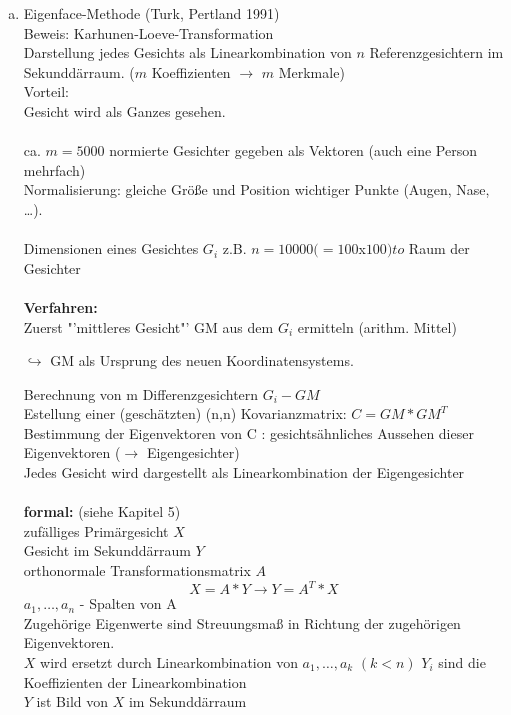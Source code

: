 \documentclass[a4paper,12pt]{scrreprt}
\newcommand{\Nb}[1]{\textbf{#1}}
\begin{document}
\begin{enumerate}[a)]
 \item Eigenface-Methode (Turk, Pertland 1991)\\
  Beweis: Karhunen-Loeve-Transformation\\
  Darstellung jedes Gesichts als Linearkombination von $n$ Referenzgesichtern im Sekunddärraum. ($m$ Koeffizienten $\to$ $m$ Merkmale) \\
  Vorteil:\\
  Gesicht wird als Ganzes gesehen.\\
  \\
  ca. $m = 5000$ normierte Gesichter gegeben als Vektoren (auch eine Person mehrfach)\\
  Normalisierung: gleiche Größe und Position wichtiger
Punkte (Augen, Nase, \dots). \\
  \\
  Dimensionen eines Gesichtes $G_i$ z.B. $n=10000(=100$x$100) to$ Raum der Gesichter\\
  \\
  \Nb{Verfahren:}\\
  Zuerst "'mittleres Gesicht"' GM aus dem $G_i$ ermitteln (arithm. Mittel)
  \begin{center}
  $\hookrightarrow$ GM als Ursprung des neuen Koordinatensystems.   
  \end{center}
  Berechnung von m Differenzgesichtern $G_i-GM$\\
  Estellung einer (geschätzten) (n,n) Kovarianzmatrix: $C = GM*GM^T$
  Bestimmung der Eigenvektoren von C : gesichtsähnliches Aussehen dieser Eigenvektoren ($\to$ Eigengesichter) \\
  Jedes Gesicht wird dargestellt als Linearkombination der Eigengesichter\\
  \\
  \Nb{formal:} (siehe Kapitel 5)\\
  zufälliges Primärgesicht $X$\\
  Gesicht im Sekunddärraum $Y$\\
  orthonormale Transformationsmatrix $A$\\
  $$ X = A * Y \to Y = A^T * X$$
  $a_1, \dots, a_n$ - Spalten von A\\
  Zugehörige Eigenwerte sind Streuungsmaß in Richtung der zugehörigen Eigenvektoren.\\
  $X$ wird ersetzt durch Linearkombination von $a_1, \dots, a_k$ $(k<n)$
  $Y_i$ sind die Koeffizienten der Linearkombination\\
  $Y$ ist Bild von $X$ im Sekunddärraum\\

\end{enumerate}
\end{document}
